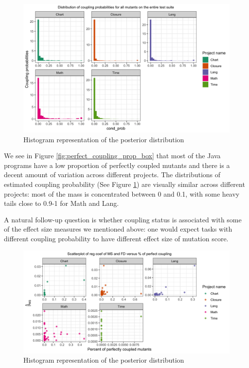 \documentclass[10pt,letterpaper]{article}
\begin{document}
      \begin{figure}[ht!]
        \centering
        \includegraphics[scale=0.1]{figures/distri_coupling_prop.png}
        \caption{Histogram representation of the posterior distribution}
        \label{fig:distri_coupling_prop}
    \end{figure}

    We see in Figure \ref{fig:perfect_coupling_prop_box} that most of the Java programs have a low proportion of perfectly coupled mutants and there is a decent amount of variation across different projects. The distributions of estimated coupling probability (See Figure \ref{fig:distri_coupling_prop}) are visually similar across different projects: most of the mass is concentrated between 0 and 0.1, with some heavy tails close to 0.9-1 for Math and Lang.


    A natural follow-up question is whether coupling status is associated with some of the effect size measures we mentioned above: one would expect tasks with different coupling probability to have different effect size of mutation score. 


  \begin{figure}[ht!]
        \centering
        \includegraphics[scale=0.15]{figures/couple_reg_coef.png}
        \caption{Histogram representation of the posterior distribution}
        \label{fig:couple_reg_coef}
    \end{figure}
\end{document}
